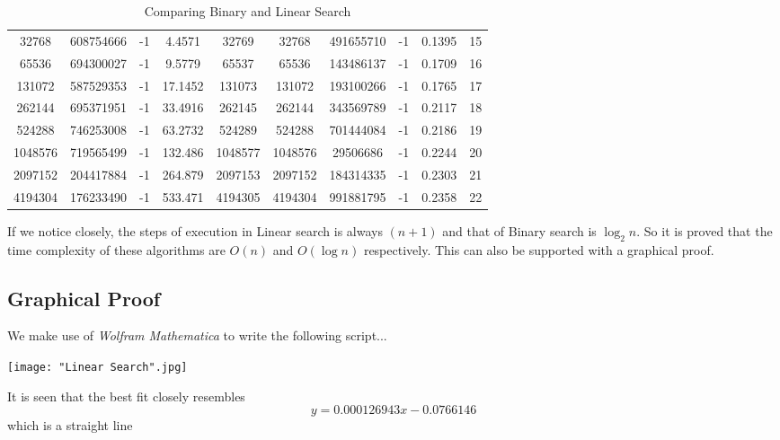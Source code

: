\documentclass[a4paper, 12pt]{article}
\begin{document}
\begin{table}[H]
\begin{center}
{\begin{tabular}{|ccccc|ccccc|}
	32768 & 608754666 & -1 & 4.4571 & 32769 & 32768 & 491655710 & -1 & 0.1395 & 15\\
	65536 & 694300027 & -1 & 9.5779 & 65537 & 65536 & 143486137 & -1 & 0.1709 & 16\\
	131072 & 587529353 & -1 & 17.1452 & 131073 & 131072 & 193100266 & -1 & 0.1765 & 17\\
	262144 & 695371951 & -1 & 33.4916 & 262145 & 262144 & 343569789 & -1 & 0.2117 & 18\\
	524288 & 746253008 & -1 & 63.2732 & 524289 & 524288 & 701444084 & -1 & 0.2186 & 19\\
	1048576 & 719565499 & -1 & 132.486 & 1048577 & 1048576 & 29506686 & -1 & 0.2244 & 20\\
	2097152 & 204417884 & -1 & 264.879 & 2097153 & 2097152 & 184314335 & -1 & 0.2303 & 21\\
	4194304 & 176233490 & -1 & 533.471 & 4194305 & 4194304 & 991881795 & -1 & 0.2358 & 22\\\hline
	\end{tabular}}
	\caption{Comparing Binary and Linear Search}\label{Table 1}
\end{center}
\end{table}
	
	\begin{flushleft}
	If we notice closely, the steps of execution in Linear search is always $(n+1)$ and that of Binary search is $\log_2 n$. So it is proved that the time complexity of these algorithms are $O(n)$ and $O(\log n)$ respectively. This can also be supported with a graphical proof.
	\end{flushleft}
	
	\pagebreak
	\subsection*{Graphical Proof}
	\begin{flushleft}
		We make use of \textit{Wolfram Mathematica} to write the following script...
	\end{flushleft}

	\begin{center}
		\texttt{[image: "Linear Search".jpg]}
	\end{center}
	
	\begin{flushleft}
		It is seen that the best fit closely resembles $$y=0.000126943x-0.0766146$$ which is a straight line
	\end{flushleft}
	
\end{document}
